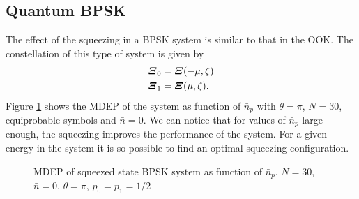     \subsection{Quantum BPSK}
    The effect of the squeezing in a BPSK system is similar to that in the OOK. The constellation
    of this type of system is given by
    \begin{subequations}
        \begin{align}
            \Operator{\varXi}_0 &= \Operator{\varXi}(-\mu,\zeta)\\
            \Operator{\varXi}_1 &= \Operator{\varXi}(\mu,\zeta).
        \end{align}
    \end{subequations}
    Figure \ref{fig:3.5} shows the MDEP of the system as function of $\bar{n}_p$
    with $\theta=\pi$, $N=30$, equiprobable symbols and $\bar{n}=0$. We can notice that
    for values of $\bar{n}_p$ large enough, the squeezing improves the performance of the 
    system. For a given energy in the system it is so possible to find an optimal squeezing 
    configuration.

    \begin{figure}[t]
        \begin{center}
            
            \caption{MDEP of squeezed state BPSK system as function of $\bar{n}_p$. 
                $N=30$, $\bar{n}=0$, $\theta=\pi$, $p_0=p_1=1/2$}
            \label{fig:3.5}
        \end{center}     
    \end{figure}
